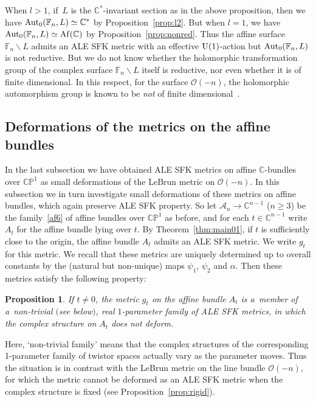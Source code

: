 \documentclass[pdftex]{sigma}
\numberwithin{equation}{section}
\newtheorem{Proposition}[Theorem]{Proposition}
{\theoremstyle{definition}
\newtheorem{Definition}[Theorem]{Definition}
\newtheorem{Remark}[Theorem]{Remark}
}
\begin{document}
When $l>1$, if~$L$ is the $\mathbb{C}^*$-invariant section as in the above proposition, then we have
${\rm{Aut}}_0(\mathbb{F}_n,L) \simeq\mathbb{C}^*$ by Proposition~\ref{prop:l2}.
But when $l=1$, we have ${\rm{Aut}}_0(\mathbb{F}_{n}, L)\simeq \rm{Af}(\mathbb{C})$ by Proposition~\ref{prop:nonred}.
Thus the af\/f\/ine surface $\mathbb{F}_n\backslash L$ admits an ALE SFK metric with an ef\/fective ${\rm{U}}(1)$-action
but ${\rm{Aut}}_0(\mathbb{F}_{n}, L)$ is not reductive.
But we do not know whether the holomorphic transformation group of the complex surface $\mathbb{F}_n\backslash L$ itself
is reductive, nor even whether it is of f\/inite dimensional.
In this respect, for the surface $\mathscr O(-n)$, the holomorphic automorphism group is known to be {\em not} of
f\/inite dimensional~\cite[Remark 2.20]{KPZ}.

\subsection{Deformations of the metrics on the af\/f\/ine bundles}

In the last subsection we have obtained ALE SFK metrics on af\/f\/ine $\mathbb{C}$-bundles over $\mathbb{CP}^1$ as small
deformations of the LeBrun metric on $\mathscr O(-n)$.
In this subsection we in turn investigate small deformations of these metrics on af\/f\/ine bundles, which again
preserve ALE SFK property.
So let $\mathscr A_n\to\mathbb{C}^{n-1}$ ($n\ge 3$) be the family~\eqref{af6} of af\/f\/ine bundles over $\mathbb{CP}^1$
as before, and for each $t\in\mathbb{C}^{n-1}$ write $A_t$ for the af\/f\/ine bundle lying over $t$.
By Theorem~\ref{thm:main01}, if $t$ is suf\/f\/iciently close to the origin, the af\/f\/ine bundle $A_t$ admits an ALE
SFK metric.
We write $g_t$ for this metric.
We recall that these metrics are uniquely determined up to overall constants by the (natural but non-unique) maps
$\psi_1$, $\psi_2$ and $\alpha$.
Then these metrics satisfy the following property:

\begin{Proposition}\label{prop:eg}
If $t\neq 0$, the metric $g_t$ on the affine bundle $A_t$ is a~member of a~non-trivial $($see below$)$, real $1$-parameter
family of ALE SFK metrics, in which the complex structure on $A_t$ does not deform.
\end{Proposition}

Here, `non-trivial family' means that the complex structures of the corresponding 1-parameter family of twistor spaces
actually vary as the parameter moves.
Thus the situation is in contrast with the LeBrun metric on the line bundle $\mathscr O(-n)$, for which the metric
cannot be deformed as an ALE SFK metric when the complex structure is f\/ixed (see Proposition~\ref{prop:rigid}).
\end{document}
